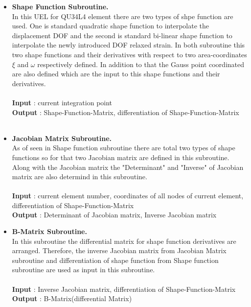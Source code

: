 \documentclass[12pt]{article}
\begin{document}
\begin{itemize}
	\item \textbf{Shape Function Subroutine.} \\
	In this UEL for QU34L4 element there are two types of shpe function are used. One is standard quadratic shape function to interpolate the displacement DOF and the second is standard bi-linear shape function to interpolate the newly introduced DOF relaxed strain. In both subroutine this two shape functions and their derivatives with respect to two area-coordinates $\xi$ and $\omega$ respectively defined. In addition to that the Gauss point coordinated are also defined which are the input to this shape functions and their derivatives. \\
	\\
	\textbf{Input} : current integration point \\
	\textbf{Output} : Shape-Function-Matrix, differentiation of Shape-Function-Matrix
	\\
	\\
	\item \textbf{Jacobian Matrix Subroutine.} \\
	As of seen in Shape function subroutine there are total two types of shape functions so for that two Jacobian matrix are defined in this subroutine. Along with the Jacobian matrix the "Determinant" and "Inverse" of Jacobian matrix are also determind in this subroutine. \\ \\
	\textbf{Input} : current element number, coordinates of all nodes of current element, \qquad  differentiation of Shape-Function-Matrix \\
	\textbf{Output} : Determinant of Jacobian matrix, Inverse Jacobian matrix

	\item \textbf{B-Matrix Subroutine.} \\
	In this subroutine the differential matrix for shape function derivatives are arranged.
	Therefore, the inverse Jacobian matrix from Jacobian Matrix subroutine and differentiation of shape function from Shape function subroutine are used as input in this subroutine. \\ \\
	\textbf{Input} : Inverse Jacobian matrix, differentiation of Shape-Function-Matrix  \\
	\textbf{Output} : B-Matrix(differential Matrix)
	

\end{itemize}
\end{document}
